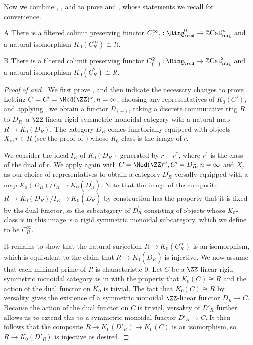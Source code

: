\documentclass[12pt,oneside]{article}
\newcommand{\ZCat}{\mathbb{Z}\mathrm{Cat}}
\begin{document}
Now we combine , , and  to prove  and , whose statements we recall for convenience.

	\begin{customthm}{A}
	There is a filtered colimit preserving functor $C^{\infty}_{(-)}:\Ring_{\red}^0 \to \ZCat^{\infty}_{\rig}$ and a natural isomorphism $K_0(C^{\infty}_R) \cong R$.
\end{customthm}


\begin{customthm}{B}
	There is a filtered colimit preserving functor $C^2_{(-)}:\Ring_{\red} \to \ZCat^2_{\rig}$ and a natural isomorphism $K_0(C^2_R) \cong R$.
\end{customthm}

\begin{proof}[Proof of  and ]
	We first prove , and then indicate the necessary changes to prove . Letting $C = C' = \Mod(\ZZ)^{\omega}, n=\infty$, choosing any representatives of $K_0(C')$, and applying , we obtain a functor $D_{(-)}$, taking a discrete commutative ring $R$ to $D_R$, a $\ZZ$-linear rigid symmetric monoidal category with a natural map $R \to K_0(D_R)$. The category $D_R$ comes functorially equipped with objects $X_r, r \in R$ (see the proof of ) whose $K_0$-class is the image of $r$. 
	
	We consider the ideal $I_R$ of $K_0(D_R)$ generated by $r- r^*$, where $r^*$ is the class of the dual of $r$. We apply  again with $C = \Mod(\ZZ)^{\omega}, C' = D_R, n=\infty$ and $X_r$ as our choice of representatives to obtain a category $D^{'}_R$ versally equipped with a map $K_0(D_R)/I_R \to K_0(D^{'}_R)$. Note that the image of the composite $R \to K_0(D_R)/I_R \to K_0(D^{'}_R)$ by construction has the property that it is fixed by the dual functor, so the subcategory of $D^{'}_R$ consisting of objects whose $K_0$-class is in this image is a rigid symmetric monoidal subcategory, which we define to be $C_{R}^{\infty}$. 
	
	It remains to show that the natural surjection $R \to K_0(C_R^{\infty})$ is an isomorphism, which is equivalent to the claim that $R \to K_0(D_R^{'})$ is injective. We now assume that each minimal prime of $R$ is characteristic $0$. Let $C$ be a $\ZZ$-linear rigid symmetric monoidal category as in  with the property that $K_0(C) \cong R$ and the action of the dual functor on $K_0$ is trivial. The fact that $K_0(C)\cong R$ by versality gives the existence of a symmetric monoidal $\ZZ$-linear functor $D_R \to C$. Because the action of the dual functor on $C$ is trivial, versality of $D'_R$ further allows us to extend this to a symmetric monoidal functor $D'_R \to C$. It then follows that the composite $R \to K_0(D'_R) \to K_0(C)$ is an isomorphism, so $R \to K_0(D'_R)$ is injective as desired.
	

\end{proof}
\end{document}
